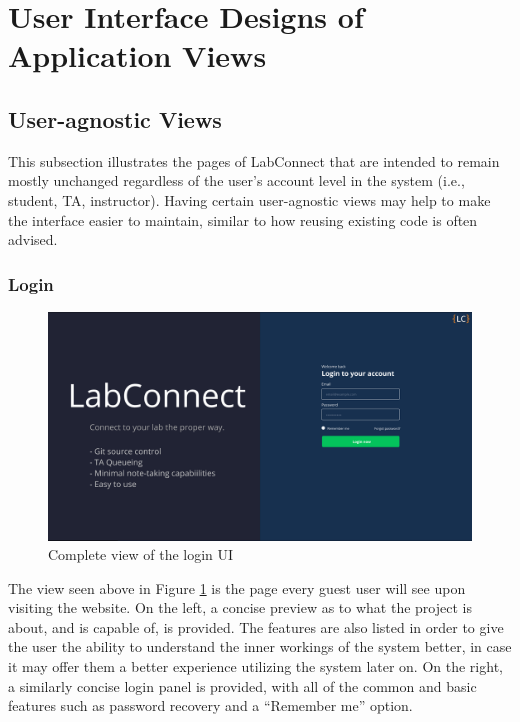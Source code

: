 \documentclass[a4paper, 12pt]{article}
\begin{document}
    
    
    
    
    
    
    
    \pagebreak
    
    \section{User Interface Designs of Application Views}
    
    \subsection{User-agnostic Views}
    
    This subsection illustrates the pages of LabConnect that are intended to remain mostly unchanged regardless of the user's account level in the system
    (i.e., student, TA, instructor). Having certain user-agnostic views may help to make the interface easier to maintain, similar to how
    reusing existing code is often advised.
    
    \subsubsection{Login}
    
    \begin{figure}[H]
        \centering
        \includegraphics[width=\textwidth]{login}
        \caption{Complete view of the login UI}
        \label{fig:login_full}
    \end{figure}
    
    The view seen above in Figure \ref{fig:login_full} is the page every guest user will see upon visiting the website.
    On the left, a concise preview as to what the project is about, and is capable of, is provided.
    The features are also listed in order to give the user the ability to understand the inner workings of the
    system better, in case it may offer them a better experience utilizing the system later on.
    On the right, a similarly concise login panel is provided, with all of the common and basic features
    such as password recovery and a ``Remember me'' option.
    
\end{document}
